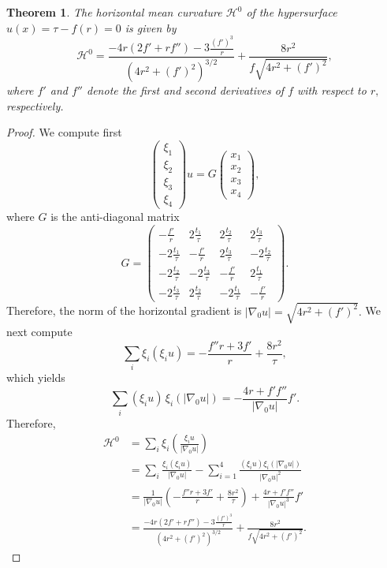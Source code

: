 \documentclass [12pt,a4paper]{amsart}
\newcommand{\calH}{\mathcal{H}}
\theoremstyle{plain}
\newtheorem{thm}{Theorem}[section]
\theoremstyle{definition}
\numberwithin{equation}{section}
\begin{document}
\begin{thm}\label{prop:HMC}
The horizontal mean curvature $\calH^0$ of the hypersurface $u(x)=\tau-f(r)=0$
is given by
\begin{equation}\label{equ:form}
\calH^0=\frac{-4r(2f'+rf'')-3\frac{(f')^3}{r}}{(4r^2+(f')^2)^{{3}/{2}}}+\frac{8r^2}{f\sqrt{4r^2+(f')^2}},
\end{equation}
where $f'$ and $f''$ denote the first and second derivatives of $f$ with respect to $r,$ respectively.
\end{thm}
\begin{proof}
We compute first
$$
\begin{pmatrix}
\xi_1 \\
\xi_2\\
\xi_3\\
\xi_4
\end{pmatrix}u=G
\begin{pmatrix}
x_1\\
x_2\\
x_3\\
x_4
\end{pmatrix},
$$
where $G$ is the anti-diagonal matrix
$$
G=
\begin{pmatrix}
   -\frac{f'}{r} &  2\frac{t_1}{\tau} &  2\frac{t_2}{\tau} &  2\frac{t_3}{\tau} \\
   -2\frac{t_1}{\tau} &    -\frac{f'}{r} & 2\frac{t_3}{\tau} & -2\frac{t_2}{\tau}\\
   -2\frac{t_2}{\tau} & -2\frac{t_3}{\tau} &    -\frac{f'}{r} & 2\frac{t_1}{\tau}\\
   -2\frac{t_3}{\tau} & 2\frac{t_2}{\tau} & -2\frac{t_1}{\tau} &   -\frac{f'}{r}
\end{pmatrix}.
$$
Therefore,  the  norm of the horizontal gradient is  $|\nabla_0 u|=\sqrt{4r^2+(f')^2}.$
We next compute 
$$
\sum_i \xi_i (\xi_i u)=-\frac{f''r+3f'}{r}+\frac{8r^2}{\tau},
$$
which yields 
$$
\sum_i (\xi_i u)\,\xi_i(|\nabla_0 u|)=-\frac{4r+f'f''}{|\nabla_0 u|}f'.
$$
Therefore,
$$
\begin{aligned}
\calH^0&=\sum_i \xi_i\left(\frac{\xi_i u}{|\nabla_0 u|}\right)\\
&=\sum_i \frac{\xi_i(\xi_i u)}{|\nabla_0u|}-\sum_{i=1}^4 \frac{(\xi_i u)\xi_i(|\nabla_0u|)}{|\nabla_0u|^2}\\
&=\frac{1}{|\nabla_0u|}\left(-\frac{f''r+3f'}{r}+\frac{8r^2}{\tau}\right)+\frac{4r+f'f''}{|\nabla_0u|^3}f'\\
&=\frac{-4r(2f'+rf'')-3\frac{(f')^3}{r}}{(4r^2+(f')^2)^{{3}/{2}}}+\frac{8r^2}{f\sqrt{4r^2+(f')^2}}.
\end{aligned}
$$
\end{proof}
\end{document}
